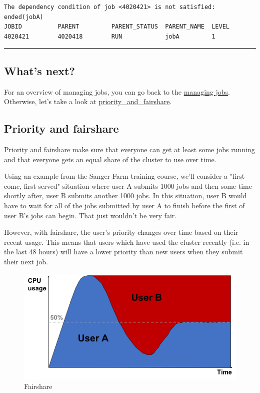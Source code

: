 \documentclass[11pt]{article}
\makeatletter
\def\maxwidth{\ifdim\Gin@nat@width>\linewidth\linewidth
    \else\Gin@nat@width\fi}
\let\Oldincludegraphics\includegraphics
\renewcommand{\includegraphics}[1]{\Oldincludegraphics[width=.8\maxwidth, height=.55\textheight, keepaspectratio]{#1}}
\makeatother
\begin{document}
    \begin{verbatim}
The dependency condition of job <4020421> is not satisfied: ended(jobA)
JOBID          PARENT         PARENT_STATUS  PARENT_NAME  LEVEL
4020421        4020418        RUN            jobA         1
\end{verbatim}

    \begin{center}\rule{0.5\linewidth}{\linethickness}\end{center}

    \subsection{What's next?}\label{whats-next}

For an overview of managing jobs, you can go back to the
\href{managing_jobs.ipynb}{managing jobs}. Otherwise, let's take a look
at \href{priority_and_fairshare.ipynb}{priority\_and\_fairshare}.





\newpage






    \subsection{Priority and fairshare}\label{priority-and-fairshare}

Priority and fairshare make sure that everyone can get at least some
jobs running and that everyone gets an equal share of the cluster to use
over time.

Using an example from the Sanger Farm training course, we'll consider a
"first come, first served" situation where user A submits 1000 jobs and
then some time shortly after, user B submits another 1000 jobs. In this
situation, user B would have to wait for all of the jobs submitted by
user A to finish before the first of user B's jobs can begin. That just
wouldn't be very fair.

However, with fairshare, the user's priority changes over time based on
their recent usage. This means that users which have used the cluster
recently (i.e. in the last 48 hours) will have a lower priority than new
users when they submit their next job.

    \begin{figure}[!h]
\centering
\includegraphics{images/cluster_fairshare.png}
\caption{Fairshare}
\end{figure}
\end{document}
